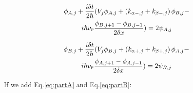 \begin{multline}
    \label{eq:partA}
    \phi_{A, j} + \frac{i\delta t}{2\hbar}(V_j\phi_{A,j} + \left(k_{\alpha-,j}+k_{\beta-,j}\right)\phi_{B,j}-\\
    i\hbar v_{\mbox{\tiny F}}\frac{\phi_{B, j+1}-\phi_{B, j-1}}{2\delta x}) = 2\psi_{A,j}
\end{multline}

\begin{multline}
    \label{eq:partB}
    \phi_{B, j} + \frac{i\delta t}{2\hbar}(V_j\phi_{B,j} + \left(k_{\alpha+,j}+k_{\beta+,j}\right)\phi_{A,j}-\\
    i\hbar v_{\mbox{\tiny F}}\frac{\phi_{A, j+1}-\phi_{A, j-1}}{2\delta x}) = 2\psi_{B,j}
\end{multline}

If we add Eq.\eqref{eq:partA} and Eq.\eqref{eq:partB}:


